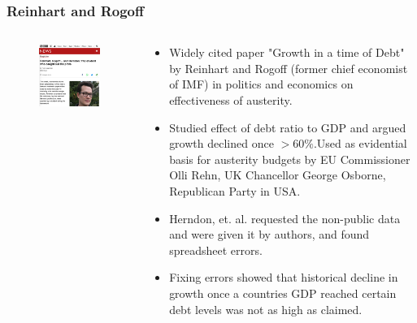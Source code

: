 \documentclass{beamer}
\begin{document}
\begin{frame}
\frametitle{Reinhart and Rogoff}
\begin{columns}
    \begin{column}{0.325\textwidth}
        \begin{figure}
            \includegraphics[width=\columnwidth]{images/reinhart.png}
        \end{figure}
    \end{column}

    \begin{column}{0.675\textwidth}
        \begin{itemize}
            \item Widely cited paper "Growth in a time of Debt" by Reinhart and Rogoff (former chief economist of IMF) in politics and economics on effectiveness of austerity.
            \item Studied effect of debt ratio to GDP and argued growth declined once $> 60\%$.Used as evidential basis for austerity budgets by EU Commissioner Olli Rehn, UK Chancellor George Osborne, Republican Party in USA.
            \item Herndon, et. al. requested the non-public data and were given it by authors, and found spreadsheet errors.
            \item Fixing errors showed that historical decline in growth once a countries GDP reached certain debt levels was not as high as claimed.
        \end{itemize}
    \end{column}
\end{columns}
\end{frame}
\end{document}
